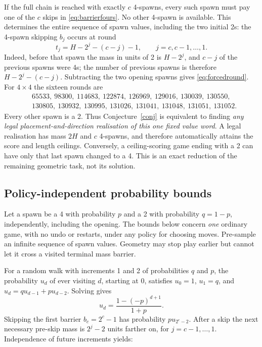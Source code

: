 If the full chain is reached with exactly $c$ 4-spawns, every such spawn
must pay one of the $c$ skips in \eqref{eq:barrierfours}. No other 4-spawn
is available. This determines the entire sequence of spawn values,
including the two initial 2s: the 4-spawn skipping $b_j$ occurs at round
\begin{equation}\label{eq:forcedround}
t_j=H-2^j-(c-j)-1,\qquad j=c,c-1,\ldots,1.
\end{equation}
Indeed, before that spawn the mass in units of 2 is $H-2^j$, and $c-j$
of the previous spawns were 4s; the number of previous spawns is therefore
$H-2^j-(c-j)$. Subtracting the two opening spawns gives \eqref{eq:forcedround}.
For $4\times4$ the sixteen rounds are
\begin{align*}
&65533,\ 98300,\ 114683,\ 122874,\ 126969,\ 129016,\ 130039,\ 130550,\\
&130805,\ 130932,\ 130995,\ 131026,\ 131041,\ 131048,\ 131051,\ 131052.
\end{align*}
Every other spawn is a 2. Thus Conjecture~\ref{conj} is equivalent to
finding \emph{any legal placement-and-direction realisation of this one
fixed value word}. A legal realisation has mass $2H$ and $c$ 4-spawns,
and therefore automatically attains the score and length ceilings.
Conversely, a ceiling-scoring game ending with a 2 can have only that
last spawn changed to a 4. This is an exact reduction of the remaining
geometric task, not its solution.

\subsection{Policy-independent probability bounds}
\label{sec:massprob}

Let a spawn be a 4 with probability $p$ and a 2 with probability $q=1-p$,
independently, including the opening. The bounds below concern \emph{one}
ordinary game, with no undo or restarts, under any policy for choosing
moves. Pre-sample an infinite sequence of spawn values. Geometry may
stop play earlier but cannot let it cross a visited terminal mass barrier.

For a random walk with increments 1 and 2 of probabilities $q$ and $p$,
the probability $u_d$ of ever visiting $d$, starting at 0, satisfies
$u_0=1$, $u_1=q$, and $u_d=qu_{d-1}+pu_{d-2}$. Solving gives
\[
u_d=\frac{1-(-p)^{d+1}}{1+p}.
\]
Skipping the first barrier $b_c=2^c-1$ has probability $p u_{2^c-2}$.
After a skip the next necessary pre-skip mass is $2^j-2$ units farther
on, for $j=c-1,\ldots,1$. Independence of future increments yields:


